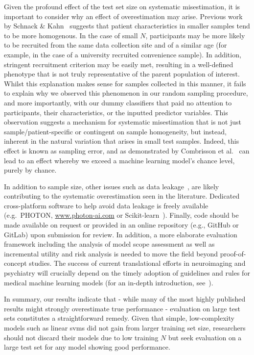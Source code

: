 \documentclass[12pt,a4paper]{article}
\begin{document}
    Given the profound effect of the test set size on systematic misestimation, it is important to consider why an effect of overestimation may arise. Previous work by Schnack \& Kahn~\cite{Schnack2016} suggests that patient characteristics in smaller samples tend to be more homogenous. In the case of small $N$, participants may be more likely to be recruited from the same data collection site and of a similar age (for example, in the case of a university recruited convenience sample). In addition, stringent recruitment criterion may be easily met, resulting in a well-defined phenotype that is not truly representative of the parent population of interest. Whilst this explanation makes sense for samples collected in this manner, it fails to explain why we observed this phenomenon in our random sampling procedure, and more importantly, with our dummy classifiers that paid no attention to participants, their characteristics, or the inputted predictor variables. This observation suggests a mechanism for systematic misestimation that is not just sample/patient-specific or contingent on sample homogeneity, but instead, inherent in the natural variation that arises in small test samples. Indeed, this effect is known as sampling error, and as demonstrated by Combrisson et al.~\cite{Combrisson2015} can lead to an effect whereby we exceed a machine learning model's chance level, purely by chance.

    In addition to sample size, other issues such as data leakage~\cite{Kambeitz2017}, are likely contributing to the systematic overestimation seen in the literature. Dedicated cross-platform software to help avoid data leakage is freely available (e.g.\ PHOTON, \url{www.photon-ai.com} or Scikit-learn~\cite{scikit-learn}). Finally, code should be made available on request or provided in an online repository (e.g., GitHub or GitLab) upon submission for review. In addition, a more elaborate evaluation framework including the analysis of model scope assessment as well as incremental utility and risk analysis is needed to move the field beyond proof-of-concept studies. The success of current translational efforts in neuroimaging and psychiatry will crucially depend on the timely adoption of guidelines and rules for medical machine learning models (for an in-depth introduction, see~\cite{Hahn2019}).

In summary, our results indicate that - while many of the most highly published results might strongly overestimate true performance - evaluation on large test sets constitutes a straightforward remedy. Given that simple, low-complexity models such as linear \acp{svm} did not gain from larger training set size, researchers should not discard their models due to low training $N$ but seek evaluation on a large test set for any model showing good performance.
\end{document}
